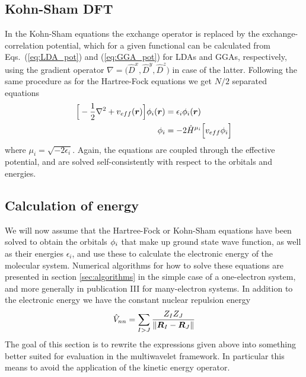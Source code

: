 \subsection{Kohn-Sham DFT}
In the Kohn-Sham equations the exchange operator is replaced by the exchange-correlation 
potential, which for a given functional can be calculated from Eqs.~(\ref{eq:LDA_pot}) and 
(\ref{eq:GGA_pot}) for LDAs and GGAs, respectively, using the gradient operator 
$\nabla=\big(\hat{D}^x,\hat{D}^y,\hat{D}^z\big)$ in case of the latter. Following the same 
procedure as for the Hartree-Fock equations we get $N/2$ separated equations
\begin{align}
    \Big[-\frac{1}{2}\nabla^2+v_{eff}(\boldsymbol r)\Big]\phi_i(\boldsymbol r) 
	    &=\epsilon_i \phi_i(\boldsymbol r)\\
    \phi_i &= -2\hat{H}^{\mu_i}\Big[v_{eff} \phi_i \Big] 
\end{align}
where $\mu_i = \sqrt{-2\epsilon_i}$. Again, the equations are coupled through the effective 
potential, and are solved self-consistently with respect to the orbitals and energies.

\subsection{Calculation of energy}
We will now assume that the Hartree-Fock or Kohn-Sham equations have been solved to obtain
the orbitals $\phi_i$ that make up ground state wave function, as well as their energies 
$\epsilon_i$, and use these to calculate the electronic energy of the molecular system.
Numerical algorithms for how to solve these equations are presented in section 
\ref{sec:algorithms} in the simple case of a one-electron system, and more generally in
publication III for many-electron systems. In addition to the electronic energy we have 
the constant nuclear repulsion energy
\begin{equation}
    \hat{V}_{nn} = \sum_{I>J} \frac{Z_IZ_J}{\|\boldsymbol R_I-\boldsymbol R_J\|}
\end{equation}
The goal of this section is to rewrite the expressions given above into something better 
suited for evaluation in the multiwavelet framework. In particular this means to avoid
the application of the kinetic energy operator.

